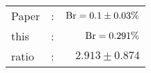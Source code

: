      \begin{tabular}{lcr}
          Paper &:& $\mathrm{Br}  = 0.1\pm 0.03\%$ \\
          this      &:& $\mathrm{Br}  = 0.291\%$ \\
		  ratio   &:& $2.913\pm 0.874$ \\
      \end{tabular}
